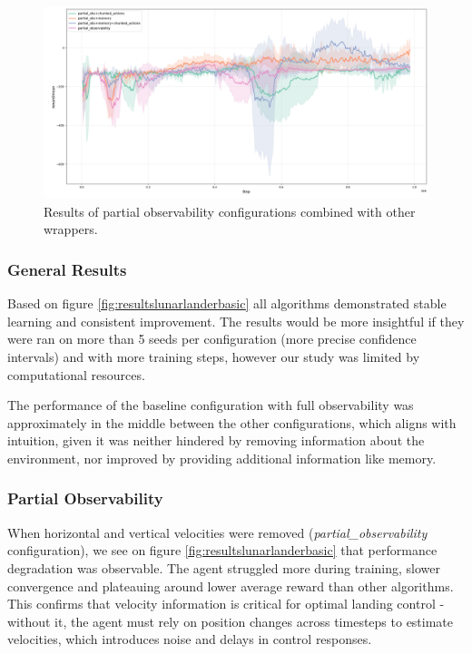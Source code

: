 \documentclass[12pt, a4paper]{article}
\begin{document}
\begin{figure}[H]
	\centering
	\includegraphics[width=1\linewidth]{results_lunar_lander_combined}
	\caption{Results of partial observability configurations combined with other wrappers.}
	\label{fig:resultslunarlandercombined}
\end{figure}


\subsubsection{General Results}

Based on figure \ref{fig:resultslunarlanderbasic} all algorithms demonstrated stable learning and consistent improvement. The results would be more insightful if they were ran on more than 5 seeds per configuration (more precise confidence intervals) and with more training steps, however our study was limited by computational resources.

The performance of the baseline configuration with full observability was approximately in the middle between the other configurations, which aligns with intuition, given it was neither hindered by removing information about the environment, nor improved by providing additional information like memory.

\subsubsection{Partial Observability}
When horizontal and vertical velocities were removed (\textit{partial\_observability} configuration), we see on figure \ref{fig:resultslunarlanderbasic} that performance degradation was  observable. The agent struggled more during training, slower convergence and plateauing around lower average reward than other algorithms. This confirms that velocity information is critical for optimal landing control - without it, the agent must rely on position changes across timesteps to estimate velocities, which introduces noise and delays in control responses.
\end{document}
